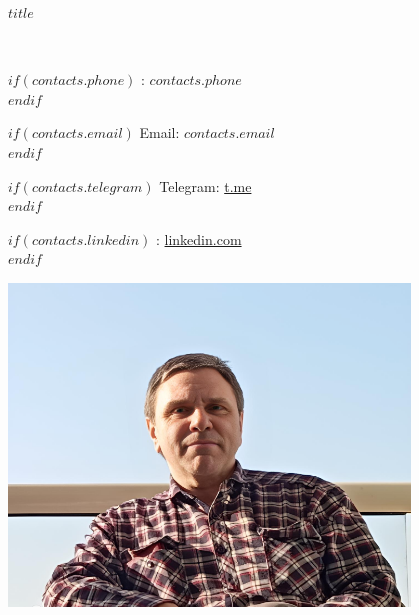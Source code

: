 \documentclass[a4paper,10pt]{article}
\begin{document}
\begin{center}
    \textbf{\huge $title$}
\end{center}
\begin{minipage}[c]{0.6\textwidth}
    \vspace*{10mm}
    \Large %
     \\
    \par\vspace*{1mm}
    \large %
    $if(contacts.phone)$ : $contacts.phone$ \\ $endif$
    \par\vspace*{1mm}
    $if(contacts.email)$ Email: \href{mailto:$contacts.email$}{$contacts.email$} \\ $endif$
    \par\vspace*{1mm}
    $if(contacts.telegram)$ Telegram: \href{https://t.me/$contacts.telegram$}{t.me} \\ $endif$
    \par\vspace*{1mm}
    $if(contacts.linkedin)$ : \href{https://$contacts.linkedin$}{linkedin.com} \\ $endif$
\end{minipage}
\begin{minipage}[t]{0.4\textwidth}
    \vspace*{-15mm}
    \raggedleft
    \includegraphics[width=0.8\textwidth,keepaspectratio]{static/img/avatar02.png}
\end{minipage}
\end{document}
